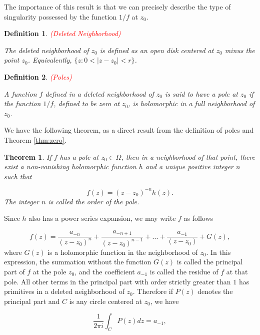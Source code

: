 \documentclass{article}
\newtheorem{definition}{Definition}
\newtheorem{theorem}{Theorem}
\begin{document}
The importance of this result is that we can precisely describe the type of singularity possessed by the function $1/f$ at $z_0$.

\begin{definition} \textcolor{red}{(Deleted Neighborhood)}

The deleted neighborhood of $z_0$ is defined as an open disk centered at $z_0$ minus the point $z_0$. Equivalently, $\{z:0<|z-z_0|<r\}$.
\end{definition}

\begin{definition} \textcolor{red}{(Poles)}

A function $f$ defined in a deleted neighborhood of $z_0$ is said to have a pole at $z_0$ if the function $1/f$, defined to be zero at $z_0$, is holomorphic in a full neighborhood of $z_0$.
\end{definition}

We have the following theorem, as a direct result from the definition of poles and Theorem \ref{thm:zero}.

\begin{theorem}
If $f$ has a pole at $z_0\in\Omega$, then in a neighborhood of that point, there exist a non-vanishing holomorphic function $h$ and a unique positive integer $n$ such that 

\begin{equation}
f(z)=(z-z_0)^{-n}h(z).
\end{equation}
The integer $n$ is called the order of the pole. 
\end{theorem}

Since $h$ also has a power series expansion, we may write $f$ as follows

\begin{equation} \label{f_pole}
f(z)=\frac{a_{-n}}{(z-z_0)^n}+\frac{a_{-n+1}}{(z-z_0)^{n-1}}+...+\frac{a_{-1}}{(z-z_0)}+G(z),
\end{equation}
where $G(z)$ is a holomorphic function in the neighborhood of $z_0$. In this expression, the summation without the function $G(z)$ is called the principal part of $f$ at the pole $z_0$, and the coefficient $a_{-1}$ is called the residue of $f$ at that pole. All other terms in the principal part with order strictly greater than $1$ has primitives in a deleted neighborhood of $z_0$. Therefore if $P(z)$ denotes the principal part and $C$ is any circle centered at $z_0$, we have 

\begin{equation}
\frac{1}{2\pi i}\int_C P(z)dz=a_{-1},
\end{equation}
\end{document}
